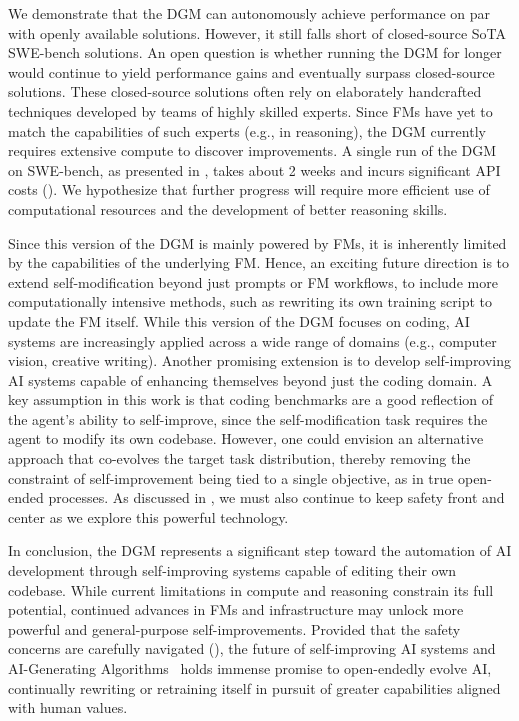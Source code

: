 \documentclass{article}
\begin{document}
We demonstrate that the DGM can autonomously achieve performance on par with openly available solutions. However, it still falls short of closed-source SoTA SWE-bench solutions. An open question is whether running the DGM for longer would continue to yield performance gains and eventually surpass closed-source solutions. These closed-source solutions often rely on elaborately handcrafted techniques developed by teams of highly skilled experts. Since FMs have yet to match the capabilities of such experts (e.g., in reasoning), the DGM currently requires extensive compute to discover improvements. A single run of the DGM on SWE-bench, as presented in , takes about 2 weeks and incurs significant API costs (). We hypothesize that further progress will require more efficient use of computational resources and the development of better reasoning skills.

Since this version of the DGM is mainly powered by FMs, it is inherently limited by the capabilities of the underlying FM. Hence, an exciting future direction is to extend self-modification beyond just prompts or FM workflows, to include more computationally intensive methods, such as rewriting its own training script to update the FM itself. While this version of the DGM focuses on coding, AI systems are increasingly applied across a wide range of domains (e.g., computer vision, creative writing). Another promising extension is to develop self-improving AI systems capable of enhancing themselves beyond just the coding domain. A key assumption in this work is that coding benchmarks are a good reflection of the agent's ability to self-improve, since the self-modification task requires the agent to modify its own codebase. However, one could envision an alternative approach that co-evolves the target task distribution, thereby removing the constraint of self-improvement being tied to a single objective, as in true open-ended processes. As discussed in , we must also continue to keep safety front and center as we explore this powerful technology.

In conclusion, the DGM represents a significant step toward the automation of AI development through self-improving systems capable of editing their own codebase. While current limitations in compute and reasoning constrain its full potential, continued advances in FMs and infrastructure may unlock more powerful and general-purpose self-improvements. Provided that the safety concerns are carefully navigated (), the future of self-improving AI systems and AI-Generating Algorithms~\citep{clune2019ai} holds immense promise to open-endedly evolve AI, continually rewriting or retraining itself in pursuit of greater capabilities aligned with human values.
\end{document}
